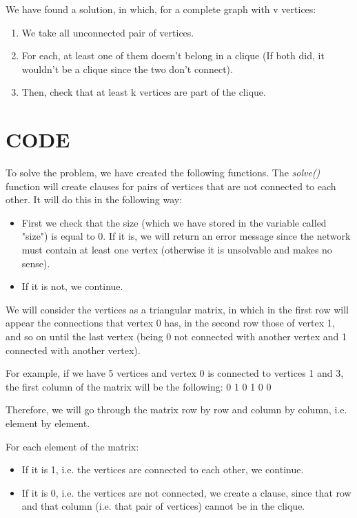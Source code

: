 \documentclass[table]{article}
\begin{document}
\leftskip=0.5in  
We have found a solution, in which, for a complete graph with v vertices:
\begin{enumerate}\leftskip=0.8in 
\item We take all unconnected pair of vertices.
\item For each, at least one of them doesn't belong in a clique (If both did, it wouldn't be a clique since the two don't connect).
\item Then, check that at least k vertices are part of the clique.
\end{enumerate}

\leftskip=0.0in  
\section{CODE}

\leftskip=0.5in  
To solve the problem, we have created the following functions.
The \textit{solve()} function will create clauses for pairs of vertices that are not connected to each other. It will do this in the following way: \newline

\begin{itemize}\leftskip=0.8in
\item First we check that the size (which we have stored in the variable called "size") is equal to 0. If it is, we will return an error message since the network must contain at least one vertex (otherwise it is unsolvable and makes no sense).
\item If it is not, we continue.
\end{itemize}
 
\leftskip=0.5in
We will consider the vertices as a triangular matrix, in which in the first row will appear the connections that vertex 0 has, in the second row those of vertex 1, and so on until the last vertex (being 0 not connected with another vertex and 1 connected with another vertex).\newline

For example, if we have 5 vertices and vertex 0 is connected to vertices 1 and 3, the first column of the matrix will be the following: 0 1 0 1 0 0

Therefore, we will go through the matrix row by row and column by column, i.e. element by element. 

For each element of the matrix:

\begin{itemize}\leftskip=0.8in
\item If it is 1, i.e. the vertices are connected to each other, we continue.
\item If it is 0, i.e. the vertices are not connected, we create a clause, since that row and that column (i.e. that pair of vertices) cannot be in the clique.
\end{itemize}
\end{document}
